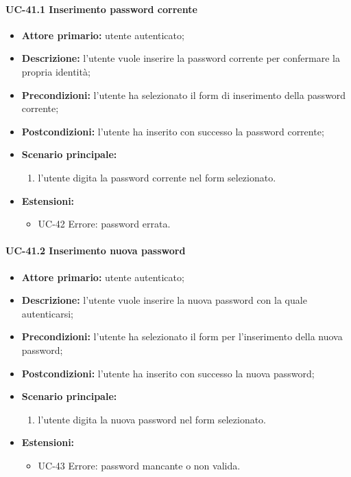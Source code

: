 \paragraph{UC-41.1 Inserimento password corrente}

	\begin{itemize}
		\item \textbf{Attore primario:} utente autenticato;

		\item \textbf{Descrizione:} l'utente vuole inserire la password corrente per confermare la propria identità;

		\item \textbf{Precondizioni:} l'utente ha selezionato il form di inserimento della password corrente;

		\item \textbf{Postcondizioni:} l'utente ha inserito con successo la password corrente;

		\item \textbf{Scenario principale:}
	  		\begin{enumerate}
		  		\item l'utente digita la password corrente nel form selezionato.
	  		\end{enumerate}
		\item \textbf{Estensioni:}
			\begin{itemize}
		  		\item UC-42 Errore: password errata.
	  		\end{itemize}
	\end{itemize}

\paragraph{UC-41.2 Inserimento nuova password}
	\begin{itemize}
		\item \textbf{Attore primario:} utente autenticato;

		\item \textbf{Descrizione:} l'utente vuole inserire la nuova password con la quale autenticarsi;

		\item \textbf{Precondizioni:} l'utente ha selezionato il form per l'inserimento della nuova password;

		\item \textbf{Postcondizioni:} l'utente ha inserito con successo la nuova password;

		\item \textbf{Scenario principale:}
	  		\begin{enumerate}
		  		\item l'utente digita la nuova password nel form selezionato.
	  		\end{enumerate}
	  	\item \textbf{Estensioni:}
	  		\begin{itemize}
		  		\item UC-43 Errore: password mancante o non valida.
	  		\end{itemize}
	\end{itemize}


